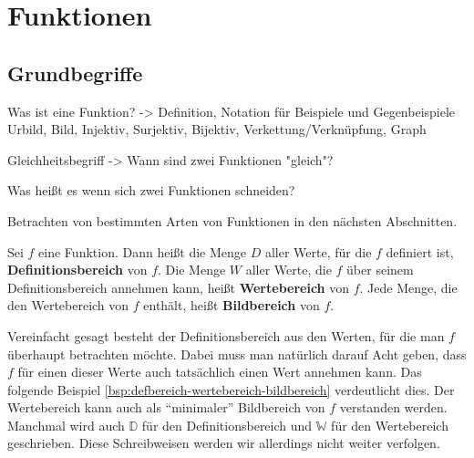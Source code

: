 \chapter{Funktionen}

\section{Grundbegriffe}
Was ist eine Funktion? -> Definition, Notation für Beispiele und Gegenbeispiele
Urbild, Bild, Injektiv, Surjektiv, Bijektiv, Verkettung/Verknüpfung, Graph

Gleichheitsbegriff -> Wann sind zwei Funktionen "gleich"?

Was heißt es wenn sich zwei Funktionen schneiden?

Betrachten von bestimmten Arten von Funktionen in den nächsten Abschnitten. 

\begin{definition}
    Sei \(f\) eine Funktion. Dann heißt die Menge \(D\) aller Werte, für die \(f\) definiert ist, \textbf{Definitionsbereich} von \(f\). Die Menge \(W\) aller Werte, die \(f\) über seinem Definitionsbereich annehmen kann, heißt \textbf{Wertebereich} von \(f\). Jede Menge, die den Wertebereich von \(f\) enthält, heißt \textbf{Bildbereich} von \(f\). 
\end{definition}
Vereinfacht gesagt besteht der Definitionsbereich aus den Werten, für die man \(f\) überhaupt betrachten möchte. Dabei muss man natürlich darauf Acht geben, dass \(f\) für einen dieser Werte auch tatsächlich einen Wert annehmen kann. Das folgende Beispiel \ref{bsp:defbereich-wertebereich-bildbereich} verdeutlicht dies. Der Wertebereich kann auch als "`minimaler"' Bildbereich von \(f\) verstanden werden. Manchmal wird auch \(\mathbb D\) für den Definitionsbereich und \(\mathbb W\) für den Wertebereich geschrieben. Diese Schreibweisen werden wir allerdings nicht weiter verfolgen. 

